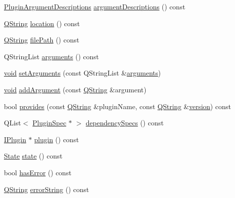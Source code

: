 \begin{DoxyCompactItemize}
\item 
\hyperlink{class_extension_system_1_1_plugin_spec_acf81cc5fcc20b047203f9da886cbbdee}{\-Plugin\-Argument\-Descriptions} \hyperlink{class_extension_system_1_1_plugin_spec_a5591aa7a260c6f74fd5abee3382658af}{argument\-Descriptions} () const 
\item 
\hyperlink{group___u_a_v_objects_plugin_gab9d252f49c333c94a72f97ce3105a32d}{\-Q\-String} \hyperlink{class_extension_system_1_1_plugin_spec_afa870ca9c67d8e09aa87dc74a5de0ba8}{location} () const 
\item 
\hyperlink{group___u_a_v_objects_plugin_gab9d252f49c333c94a72f97ce3105a32d}{\-Q\-String} \hyperlink{class_extension_system_1_1_plugin_spec_a9acb85e370ec9ee96c27860dc1ceccd6}{file\-Path} () const 
\item 
\-Q\-String\-List \hyperlink{class_extension_system_1_1_plugin_spec_a1d67bb71bc40bb5c90eb197503e103b7}{arguments} () const 
\item 
\hyperlink{group___u_a_v_objects_plugin_ga444cf2ff3f0ecbe028adce838d373f5c}{void} \hyperlink{class_extension_system_1_1_plugin_spec_a27d7c6644d5757da46391cc82803e42d}{set\-Arguments} (const \-Q\-String\-List \&\hyperlink{class_extension_system_1_1_plugin_spec_a1d67bb71bc40bb5c90eb197503e103b7}{arguments})
\item 
\hyperlink{group___u_a_v_objects_plugin_ga444cf2ff3f0ecbe028adce838d373f5c}{void} \hyperlink{class_extension_system_1_1_plugin_spec_a648a51e79049f3a3e0b67596befc8639}{add\-Argument} (const \hyperlink{group___u_a_v_objects_plugin_gab9d252f49c333c94a72f97ce3105a32d}{\-Q\-String} \&argument)
\item 
bool \hyperlink{class_extension_system_1_1_plugin_spec_a1bc08643fc8637379344949ac8062773}{provides} (const \hyperlink{group___u_a_v_objects_plugin_gab9d252f49c333c94a72f97ce3105a32d}{\-Q\-String} \&plugin\-Name, const \hyperlink{group___u_a_v_objects_plugin_gab9d252f49c333c94a72f97ce3105a32d}{\-Q\-String} \&\hyperlink{class_extension_system_1_1_plugin_spec_aa4e3f800e656d5c849a91247fa4a5b71}{version}) const 
\item 
\-Q\-List$<$ \hyperlink{class_extension_system_1_1_plugin_spec}{\-Plugin\-Spec} $\ast$ $>$ \hyperlink{class_extension_system_1_1_plugin_spec_aea749392b5e9b90bf580fae85b956e12}{dependency\-Specs} () const 
\item 
\hyperlink{class_extension_system_1_1_i_plugin}{\-I\-Plugin} $\ast$ \hyperlink{class_extension_system_1_1_plugin_spec_ae6e82e9c2548b309eafbadfffffd4cc6}{plugin} () const 
\item 
\hyperlink{class_extension_system_1_1_plugin_spec_a3d40e1bd1f17eb32b314bcd282b3e3b9}{\-State} \hyperlink{class_extension_system_1_1_plugin_spec_a2ce7fae71669e79fc1e4a227afee2c78}{state} () const 
\item 
bool \hyperlink{class_extension_system_1_1_plugin_spec_a4f81e50b4662bbe22fe207d66963b712}{has\-Error} () const 
\item 
\hyperlink{group___u_a_v_objects_plugin_gab9d252f49c333c94a72f97ce3105a32d}{\-Q\-String} \hyperlink{class_extension_system_1_1_plugin_spec_a5c7e05df1ab79d1c67140f72237e92e5}{error\-String} () const 
\end{DoxyCompactItemize}
